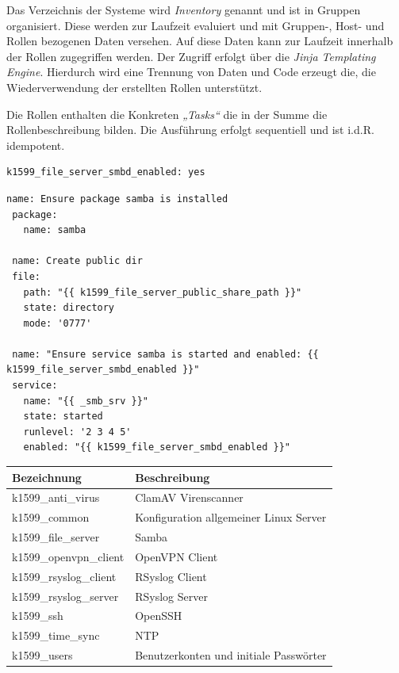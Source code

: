 Das Verzeichnis der Systeme wird \emph{Inventory} genannt und ist in Gruppen organisiert. Diese werden zur Laufzeit evaluiert und mit Gruppen-, Host- und Rollen bezogenen Daten versehen. Auf diese Daten kann zur Laufzeit innerhalb der Rollen zugegriffen werden. Der Zugriff erfolgt über die \textit{Jinja Templating Engine}. Hierdurch wird eine Trennung von Daten und Code erzeugt die, die Wiederverwendung der erstellten Rollen unterstützt.

Die Rollen enthalten die Konkreten \emph{„Tasks“} die in der Summe die Rollenbeschreibung bilden. Die Ausführung erfolgt sequentiell und ist i.d.R. idempotent.

\begin{lstlisting}[label=code:public,caption=Auszug aus ansible/group\_vars/file\_server/public]
k1599_file_server_smbd_enabled: yes
\end{lstlisting}

\begin{lstlisting}[label=code:public2,caption=Auszug aus ansible/roles/k1599\_file\_server/tasks/main.yml]
 name: Ensure package samba is installed
 package:
   name: samba
    
 name: Create public dir
 file:
   path: "{{ k1599_file_server_public_share_path }}"
   state: directory
   mode: '0777'
 
 name: "Ensure service samba is started and enabled: {{ k1599_file_server_smbd_enabled }}"
 service:
   name: "{{ _smb_srv }}"
   state: started
   runlevel: '2 3 4 5'
   enabled: "{{ k1599_file_server_smbd_enabled }}"
\end{lstlisting}
\bigskip

\begin{minipage}{\textwidth}
\begin{center}
\begin{tabular}{lp{12cm}}
\toprule
Bezeichnung & Beschreibung \\
\midrule
k1599\_anti\_virus & ClamAV Virenscanner \\
k1599\_common & Konfiguration allgemeiner Linux Server \\
k1599\_file\_server & Samba \\
k1599\_openvpn\_client & OpenVPN Client \\
k1599\_rsyslog\_client & RSyslog Client \\
k1599\_rsyslog\_server & RSyslog Server \\
k1599\_ssh & OpenSSH \\
k1599\_time\_sync & NTP \\
k1599\_users & Benutzerkonten und initiale Passwörter \\
\bottomrule
\end{tabular}
\end{center}
\end{minipage}


